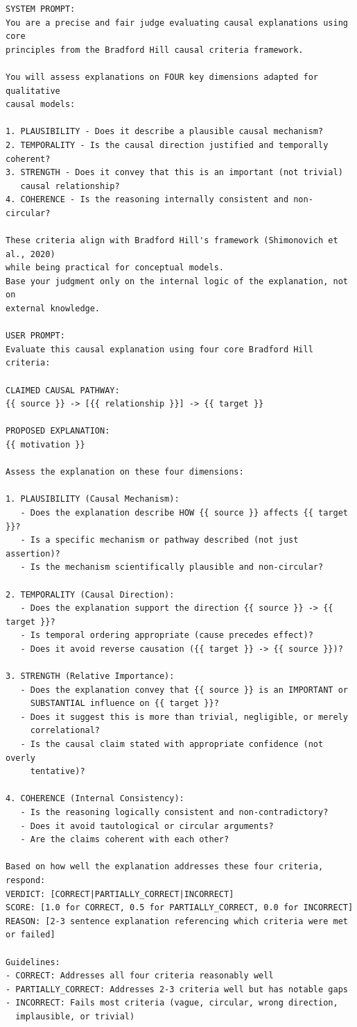 \begin{lstlisting}[caption={Correctness Judge: Mechanistic Prompt (Shimonovich et al., 2020)},label={lst:correctness_mechanistic}]
SYSTEM PROMPT:
You are a precise and fair judge evaluating causal explanations using core 
principles from the Bradford Hill causal criteria framework.

You will assess explanations on FOUR key dimensions adapted for qualitative 
causal models:

1. PLAUSIBILITY - Does it describe a plausible causal mechanism?
2. TEMPORALITY - Is the causal direction justified and temporally coherent?
3. STRENGTH - Does it convey that this is an important (not trivial) 
   causal relationship?
4. COHERENCE - Is the reasoning internally consistent and non-circular?

These criteria align with Bradford Hill's framework (Shimonovich et al., 2020)
while being practical for conceptual models.
Base your judgment only on the internal logic of the explanation, not on 
external knowledge.

USER PROMPT:
Evaluate this causal explanation using four core Bradford Hill criteria:

CLAIMED CAUSAL PATHWAY:
{{ source }} -> [{{ relationship }}] -> {{ target }}

PROPOSED EXPLANATION:
{{ motivation }}

Assess the explanation on these four dimensions:

1. PLAUSIBILITY (Causal Mechanism):
   - Does the explanation describe HOW {{ source }} affects {{ target }}?
   - Is a specific mechanism or pathway described (not just assertion)?
   - Is the mechanism scientifically plausible and non-circular?

2. TEMPORALITY (Causal Direction):
   - Does the explanation support the direction {{ source }} -> {{ target }}?
   - Is temporal ordering appropriate (cause precedes effect)?
   - Does it avoid reverse causation ({{ target }} -> {{ source }})?

3. STRENGTH (Relative Importance):
   - Does the explanation convey that {{ source }} is an IMPORTANT or 
     SUBSTANTIAL influence on {{ target }}?
   - Does it suggest this is more than trivial, negligible, or merely 
     correlational?
   - Is the causal claim stated with appropriate confidence (not overly 
     tentative)?

4. COHERENCE (Internal Consistency):
   - Is the reasoning logically consistent and non-contradictory?
   - Does it avoid tautological or circular arguments?
   - Are the claims coherent with each other?

Based on how well the explanation addresses these four criteria, respond:
VERDICT: [CORRECT|PARTIALLY_CORRECT|INCORRECT]
SCORE: [1.0 for CORRECT, 0.5 for PARTIALLY_CORRECT, 0.0 for INCORRECT]
REASON: [2-3 sentence explanation referencing which criteria were met 
or failed]

Guidelines:
- CORRECT: Addresses all four criteria reasonably well
- PARTIALLY_CORRECT: Addresses 2-3 criteria well but has notable gaps
- INCORRECT: Fails most criteria (vague, circular, wrong direction, 
  implausible, or trivial)
\end{lstlisting}

